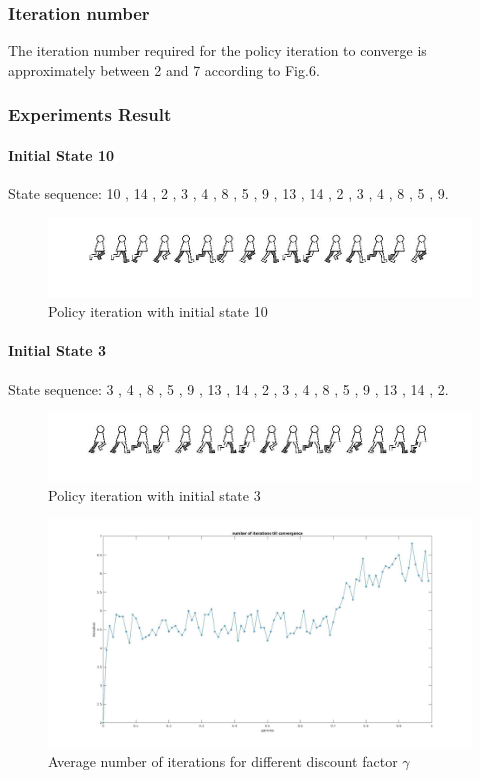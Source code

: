 \documentclass{article}
\begin{document}
\subsubsection{Iteration number}
The iteration number required for the policy iteration to converge is approximately between 2 and 7 according to Fig.6.

\newpage

\subsubsection{Experiments Result}
\paragraph{Initial State 10}
State sequence:	
10 ,    14 ,     2 ,     3 ,     4 ,     8 ,     5 ,     9 ,    13 ,    14 ,     2 ,     3 ,     4 ,     8 ,     5 ,     9.
\begin{figure}[ht]
	\centering
	\includegraphics[width=1\linewidth]{policy_10.jpg} 
	\caption{Policy iteration with initial state 10}  	
\end{figure}
\paragraph{Initial State 3}
State sequence:	3  ,   4  ,   8  ,   5 ,    9 ,   13  ,  14 ,    2    , 3  ,   4  ,   8   ,  5   ,  9   , 13   , 14  ,   2.
\begin{figure}[ht]
	\centering
	\includegraphics[width=1\linewidth]{policy_3.jpg} 
	\caption{Policy iteration with initial state 3}  	
\end{figure}

\begin{figure}[ht]
	\centering
	\includegraphics[width=0.8\linewidth]{iteration.jpg} 
	\caption{Average number of iterations for different discount factor $\gamma$}  	
\end{figure}
\end{document}
